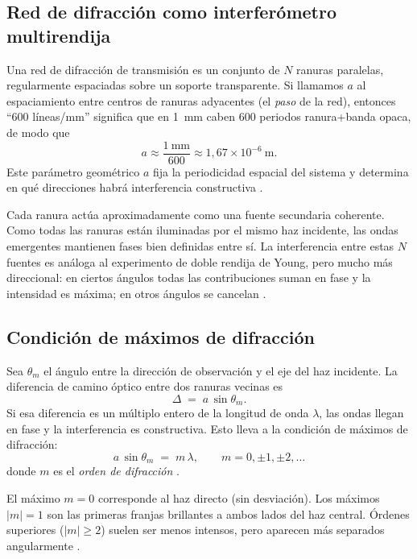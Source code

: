 \documentclass[11pt,twocolumn]{article}
\begin{document}
\subsection{Red de difracción como interferómetro multirendija}

Una red de difracción de transmisión es un conjunto de $N$ ranuras paralelas, regularmente espaciadas sobre un soporte transparente. Si llamamos $a$ al espaciamiento entre centros de ranuras adyacentes (el \emph{paso} de la red), entonces ``600 líneas/mm'' significa que en \SI{1}{mm} caben 600 periodos ranura+banda opaca, de modo que
\begin{equation*}
    a \approx \frac{1\ \text{mm}}{600}
    \approx 1{,}67\times 10^{-6}\ \text{m}.
\end{equation*}
Este parámetro geométrico $a$ fija la periodicidad espacial del sistema y determina en qué direcciones habrá interferencia constructiva \cite{hecht_optics,pedrotti_optics}.

Cada ranura actúa aproximadamente como una fuente secundaria coherente. Como todas las ranuras están iluminadas por el mismo haz incidente, las ondas emergentes mantienen fases bien definidas entre sí. La interferencia entre estas $N$ fuentes es análoga al experimento de doble rendija de Young, pero mucho más direccional: en ciertos ángulos todas las contribuciones suman en fase y la intensidad es máxima; en otros ángulos se cancelan \cite{young_freedman}.

\subsection{Condición de máximos de difracción}

Sea $\theta_m$ el ángulo entre la dirección de observación y el eje del haz incidente. La diferencia de camino óptico entre dos ranuras vecinas es
\begin{equation*}
    \Delta \;=\; a \,\sin\theta_m.
\end{equation*}
Si esa diferencia es un múltiplo entero de la longitud de onda $\lambda$, las ondas llegan en fase y la interferencia es constructiva. Esto lleva a la condición de máximos de difracción:
\begin{equation}
    a \,\sin\theta_m \;=\; m\,\lambda,
    \qquad m = 0, \pm1, \pm2, \ldots
    \label{eq:maximos}
\end{equation}
donde $m$ es el \emph{orden de difracción} \cite{hecht_optics,tipler_mosca}.  

El máximo $m=0$ corresponde al haz directo (sin desviación). Los máximos $|m|=1$ son las primeras franjas brillantes a ambos lados del haz central. Órdenes superiores ($|m|\ge 2$) suelen ser menos intensos, pero aparecen más separados angularmente \cite{pedrotti_optics}.
\end{document}
